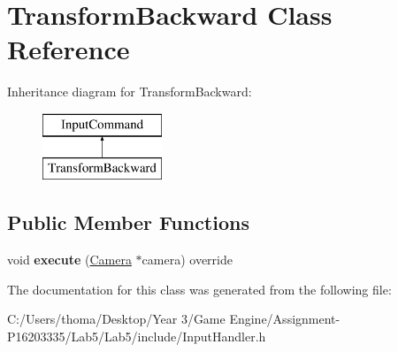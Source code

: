 \hypertarget{class_transform_backward}{}\section{Transform\+Backward Class Reference}
\label{class_transform_backward}
Inheritance diagram for Transform\+Backward\+:\begin{figure}[H]
\begin{center}
\leavevmode
\includegraphics[height=2.000000cm]{class_transform_backward}
\end{center}
\end{figure}
\subsection*{Public Member Functions}
\begin{DoxyCompactItemize}
\item 
\mbox{\label{class_transform_backward_a51f9f58e07f723c151ec7617e2420bbd}} 
void {\bfseries execute} (\mbox{\hyperlink{class_camera}{Camera}} $\ast$camera) override
\end{DoxyCompactItemize}


The documentation for this class was generated from the following file\+:\begin{DoxyCompactItemize}
\item 
C\+:/\+Users/thoma/\+Desktop/\+Year 3/\+Game Engine/\+Assignment-\/\+P16203335/\+Lab5/\+Lab5/include/Input\+Handler.\+h\end{DoxyCompactItemize}
